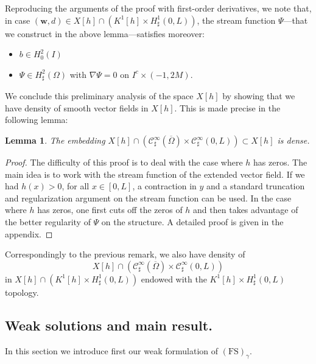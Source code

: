 \documentclass[JEP,XML,SOM,Unicode,NoFloatCountersInSection]{cedram}
\let\mathcal\mathscr
\newcommand{\FS}{\mathrm{FS}}
\newtheorem{lemma}[theorem]{Lemma}
\theoremstyle{remark}
\theoremstyle{definition}
\newcommand{\wg}{\boldsymbol{w}}
\let\CM\Omega
\begin{document}
Reproducing the arguments of the proof with first-order derivatives, we note that, in case $(\wg,d) \in X[h] \cap (K^1[h] \times H^1_{\sharp}(0,L))$, the stream function $\Psi$---that we construct in the above lemma---satisfies moreover:\enlargethispage{.5\baselineskip}%
\begin{itemize}
\item $ b \in H^2_0(I)$
\item $ \Psi \in H^2_{\sharp}(\Omega)$ with $\nabla \Psi = 0$ on $I^c \times (-1,2M)$.
\end{itemize}
We conclude this preliminary analysis of the space $X[h]$
by showing that we have density of smooth vector fields in
$X[h]$. This is made precise in the following lemma:

\begin{lemma}\label{lemma.density}The embedding $X[h]\cap (\mathcal{C}_\sharp^{\infty}(\overline{\CM})\times\mathcal{C}_\sharp^{\infty}(0, L))\subset X[h]$ is dense.
\end{lemma}
\begin{proof}
The difficulty of this proof is to deal with the case where $h$ has zeros. The main idea is to work with the stream function
of the extended vector field. If we had $h(x)>0$, for all $x\in [0, L]$, a contraction in $y$ and a standard truncation and regularization argument on the stream function can be used. In the case where $h$ has zeros, one first cuts off the zeros of $h$ and then takes advantage of the better regularity of $\Psi$ on the structure. A detailed proof is given in the appendix.
\end{proof}

Correspondingly to the previous remark, we also have density of\vspace*{-3pt}
\[
X[h] \cap (\mathcal{C}_\sharp^{\infty}(\overline{\CM})\times\mathcal{C}_\sharp^{\infty}(0, L))
\]
in $X[h] \cap (K^1[h] \times H^1_{\sharp}(0,L))$ endowed with the $K^1[h] \times H^1_{\sharp}(0,L)$
topology.

\subsection{Weak solutions and main result.}

In this section we introduce first our weak formulation of $(\FS)_{\gamma}$.
\end{document}
